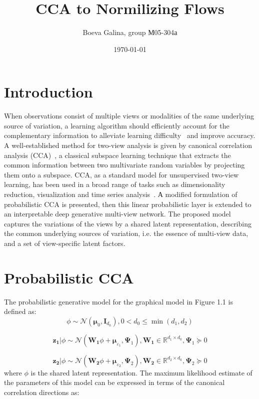 \documentclass[a4paper,12pt]{article}
\author{Boeva Galina, group М05-304а}
\title{\textbf{CCA to Normilizing Flows}}
\date{\today}
\renewcommand{\epsilon}{\ensuremath{\varepsilon}}
\renewcommand{\leq}{\ensuremath{\leqslant}}
\theoremstyle{plain} %
\theoremstyle{definition} %
\theoremstyle{remark} %
\begin{document}
\maketitle

\section*{Introduction}

When observations consist of multiple views or modalities of the same underlying source of variation, a learning algorithm should efficiently account for the complementary information to alleviate learning difficulty~\cite{chaudhuri2009consequences} and improve accuracy. A well-established method for two-view analysis is given by canonical correlation analysis (CCA)~\cite{hotelling1992relations}, a classical subspace learning technique that extracts the common information between
two multivariate random variables by projecting them onto a subspace. CCA, as a standard model for unsupervised two-view learning, has been used in a broad range of tasks such as dimensionality reduction, visualization and time series analysis~\cite{xia2014two}. А modified formulation of probabilistic CCA is presented, then this linear probabilistic layer is extended to an interpretable deep generative multi-view network. The proposed model captures the variations of the views by a shared latent representation, describing the common underlying sources of variation, i.e. the essence of multi-view data,
and a set of view-specific latent factors. 

\section*{Probabilistic CCA}
The probabilistic generative model for the graphical
model in Figure 1.1 is defined as:
\begin{equation}
\phi \sim \mathcal{N}(\boldsymbol{\mu}_0, \boldsymbol{I}_{d_0}), 0 < d_0 \leq \min(d_1, d_2)
\end{equation}

\begin{equation}
\boldsymbol{z_1} | \phi \sim \mathcal{N}(\boldsymbol{W_1} \phi + \boldsymbol{\mu}_{\epsilon_1}, \boldsymbol{\Psi}_1), \boldsymbol{W_1} \in \mathbb{R}^{d_1 \times d_0}, \boldsymbol{\Psi}_1 \succeq 0
\end{equation}

\begin{equation}
\boldsymbol{z_2} | \phi \sim \mathcal{N}(\boldsymbol{W_2} \phi + \boldsymbol{\mu}_{\epsilon_2}, \boldsymbol{\Psi}_2), \boldsymbol{W_2} \in \mathbb{R}^{d_2 \times d_0}, \boldsymbol{\Psi}_2 \succeq 0
\end{equation}
where $\phi$ is the shared latent representation. The maximum likelihood estimate of the parameters of this model can be expressed in terms of the canonical correlation directions as:
\end{document}
